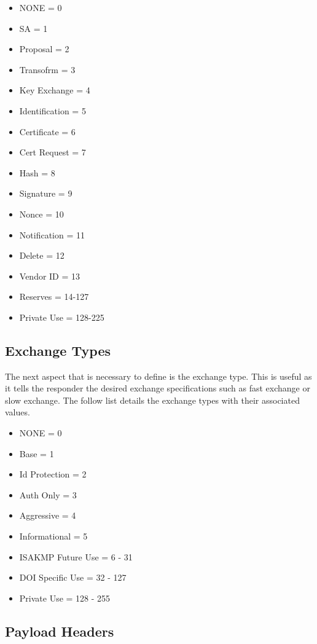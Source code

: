 \documentclass{report}
\newcommand{\squash}{\itemsep=0pt\parskip=0pt}
\begin{document}
\begin{itemize}
  \squash
\item NONE = 0
\item SA = 1
\item Proposal = 2
\item Transofrm = 3
\item Key Exchange = 4
\item Identification = 5
\item Certificate = 6
\item Cert Request = 7
\item Hash = 8
\item Signature = 9
\item Nonce = 10
\item Notification = 11
\item Delete = 12
\item Vendor ID = 13
\item Reserves = 14-127
\item Private Use = 128-225
\end{itemize}

\subsection {Exchange Types}

The next aspect that is necessary to define is the exchange type. This is useful as it tells the responder the desired exchange specifications such as fast exchange or slow exchange. The follow list details the exchange types with their associated values. 

\begin{itemize}
   \squash
\item NONE = 0
\item Base = 1
\item Id Protection = 2
\item Auth Only = 3
\item Aggressive = 4
\item Informational = 5
\item ISAKMP Future Use = 6 - 31
\item DOI Specific Use = 32 - 127
\item Private Use = 128 - 255
\end{itemize}

\subsection {Payload Headers}
\end{document}
